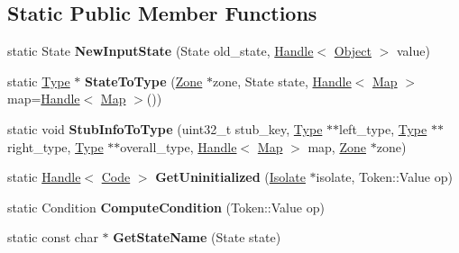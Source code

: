 \subsection*{Static Public Member Functions}
\begin{DoxyCompactItemize}
\item 
\hypertarget{classv8_1_1internal_1_1_compare_i_c_a3216fa2a3c1a39236c4b56c15f5e32d5}{}static State {\bfseries New\+Input\+State} (State old\+\_\+state, \hyperlink{classv8_1_1internal_1_1_handle}{Handle}$<$ \hyperlink{classv8_1_1internal_1_1_object}{Object} $>$ value)\label{classv8_1_1internal_1_1_compare_i_c_a3216fa2a3c1a39236c4b56c15f5e32d5}

\item 
\hypertarget{classv8_1_1internal_1_1_compare_i_c_ad815f46d0c91f7bf9968726728d0efed}{}static \hyperlink{classv8_1_1internal_1_1_type_impl}{Type} $\ast$ {\bfseries State\+To\+Type} (\hyperlink{classv8_1_1internal_1_1_zone}{Zone} $\ast$zone, State state, \hyperlink{classv8_1_1internal_1_1_handle}{Handle}$<$ \hyperlink{classv8_1_1internal_1_1_map}{Map} $>$ map=\hyperlink{classv8_1_1internal_1_1_handle}{Handle}$<$ \hyperlink{classv8_1_1internal_1_1_map}{Map} $>$())\label{classv8_1_1internal_1_1_compare_i_c_ad815f46d0c91f7bf9968726728d0efed}

\item 
\hypertarget{classv8_1_1internal_1_1_compare_i_c_a33f61762cf45afebe6d4bb87b8e04c8f}{}static void {\bfseries Stub\+Info\+To\+Type} (uint32\+\_\+t stub\+\_\+key, \hyperlink{classv8_1_1internal_1_1_type_impl}{Type} $\ast$$\ast$left\+\_\+type, \hyperlink{classv8_1_1internal_1_1_type_impl}{Type} $\ast$$\ast$right\+\_\+type, \hyperlink{classv8_1_1internal_1_1_type_impl}{Type} $\ast$$\ast$overall\+\_\+type, \hyperlink{classv8_1_1internal_1_1_handle}{Handle}$<$ \hyperlink{classv8_1_1internal_1_1_map}{Map} $>$ map, \hyperlink{classv8_1_1internal_1_1_zone}{Zone} $\ast$zone)\label{classv8_1_1internal_1_1_compare_i_c_a33f61762cf45afebe6d4bb87b8e04c8f}

\item 
\hypertarget{classv8_1_1internal_1_1_compare_i_c_a8002e3bdb5de3f4dbbf9a20c1a9b94c3}{}static \hyperlink{classv8_1_1internal_1_1_handle}{Handle}$<$ \hyperlink{classv8_1_1internal_1_1_code}{Code} $>$ {\bfseries Get\+Uninitialized} (\hyperlink{classv8_1_1internal_1_1_isolate}{Isolate} $\ast$isolate, Token\+::\+Value op)\label{classv8_1_1internal_1_1_compare_i_c_a8002e3bdb5de3f4dbbf9a20c1a9b94c3}

\item 
\hypertarget{classv8_1_1internal_1_1_compare_i_c_a67d9907f5802e582d5cf5487d7adca59}{}static Condition {\bfseries Compute\+Condition} (Token\+::\+Value op)\label{classv8_1_1internal_1_1_compare_i_c_a67d9907f5802e582d5cf5487d7adca59}

\item 
\hypertarget{classv8_1_1internal_1_1_compare_i_c_a45344065fe070a4870de48faaf027032}{}static const char $\ast$ {\bfseries Get\+State\+Name} (State state)\label{classv8_1_1internal_1_1_compare_i_c_a45344065fe070a4870de48faaf027032}

\end{DoxyCompactItemize}
